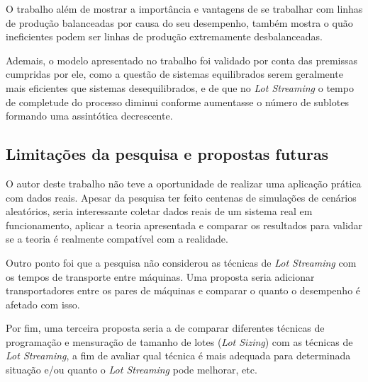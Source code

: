 O trabalho além de mostrar a importância e vantagens de se trabalhar com linhas de produção balanceadas por causa do seu desempenho, também mostra o quão ineficientes podem ser linhas de produção extremamente desbalanceadas. 

Ademais, o modelo apresentado no trabalho foi validado por conta das premissas cumpridas por ele, como a questão de sistemas equilibrados serem geralmente mais eficientes que sistemas desequilibrados, e de que no \textit{Lot Streaming} o tempo de completude do processo diminui conforme aumentasse o número de sublotes formando uma assintótica decrescente.


    \subsection{Limitações da pesquisa e propostas futuras}
    
    O autor deste trabalho não teve a oportunidade de realizar uma aplicação prática com dados reais. Apesar da pesquisa ter feito centenas de simulações de cenários aleatórios, seria interessante coletar dados reais de um sistema real em funcionamento, aplicar a teoria apresentada e comparar os resultados para validar se a teoria é realmente compatível com a realidade.
    
    Outro ponto foi que a pesquisa não considerou as técnicas de \textit{Lot Streaming} com os tempos de transporte entre máquinas. Uma proposta seria adicionar transportadores entre os pares de máquinas e comparar o quanto o desempenho é afetado com isso. 
    
    Por fim, uma terceira proposta seria a de comparar diferentes técnicas de programação e mensuração de tamanho de lotes (\textit{Lot Sizing}) com as técnicas de \textit{Lot Streaming}, a fim de avaliar qual técnica é mais adequada para determinada situação e/ou quanto o \textit{Lot Streaming} pode melhorar, etc.  